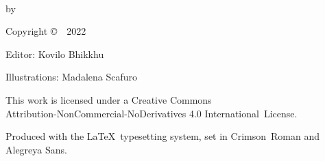 \cleartoverso
\thispagestyle{empty}

{\copyrightsize
\centering
\setlength{\parindent}{0pt}%
\setlength{\parskip}{0.8\baselineskip}%

\thetitle\\
by \theauthor

% 

Copyright \copyright\ \theauthor\ 2022

Editor: Kovilo Bhikkhu

Illustrations: Madalena Scafuro

\vfill

This work is licensed under a Creative Commons\\
Attribution-NonCommercial-NoDerivatives 4.0 International~License.

Produced with the \LaTeX\ typesetting system, set in Crimson~Roman and Alegreya Sans.

\theEditionInfo

}
